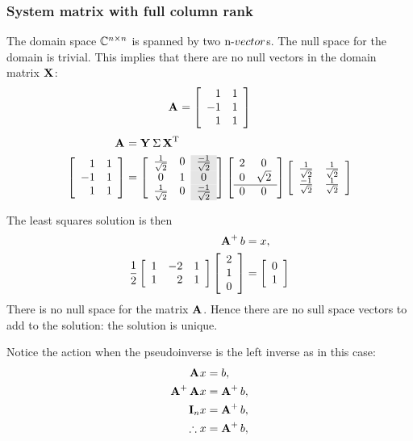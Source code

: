 \subsubsection{System matrix with full column rank}
The domain space $\cmplx{n\times n}$ is spanned by two $\nv$s. The null space for the domain is trivial.
This implies that there are no null vectors in the domain matrix $\X{}$:
\begin{equation}
  \A{} = \mat{rr}{1&1\\-1&1\\1&1}
\end{equation}
\begin{equation}
  \begin{split}
    \svda{T} \\
    \mat{rr}{1&1\\-1&1\\1&1} & = 
\mat{cc>{\columncolor{ltgray}}c}{\stwo & 0 & \nstwo \\ 0 & 1 & 0 \\ \stwo & 0 & \nstwo}
\mat{cc}{2 & 0 \\ 0 & \sqrt{2} \\\hline 0 & 0 }
\mat{cc}{\stwo & \stwo \\ \nstwo & \stwo}
  \end{split}
\end{equation}

The least squares solution is then
\begin{equation}
\begin{split}
  \Ap b & = x,\\
  \rtwo \mat{crc}{1 & -2 & 1 \\ 1 & 2 & 1} \phivector &= \mat{c}{0\\1}
\end{split}
\end{equation}
There is no null space for the matrix $\A{}$. Hence there are no sull space vectors to add to the solution: the solution is unique. 

Notice the action when the pseudoinverse is the left inverse as in this case:
\begin{equation}
  \begin{split}
    \A{}x & = b, \\
    \Ap\A{}x & = \Ap b, \\
    \I{n} x & = \Ap b, \\
    \therefore x & = \Ap b, \\
  \end{split}
\end{equation}


